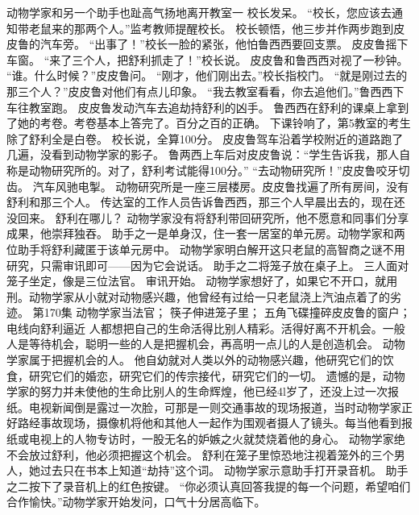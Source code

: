 \documentclass[a4paper,12pt,UTF8,twoside]{ctexbook}
\begin{document}
        动物学家和另一个助手也趾高气扬地离开教室一 
        校长发呆。 
        “校长，您应该去通知带老鼠来的那两个人。”监考教师提醒校长。 
        校长顿悟，他三步并作两步跑到皮皮鲁的汽车旁。 
        “出事了！”校长一脸的紧张，他怕鲁西西要回支票。 
        皮皮鲁摇下车窗。 
        “来了三个人，把舒利抓走了！”校长说。 
        皮皮鲁和鲁西西对视了一秒钟。 
        “谁。什么时候？”皮皮鲁问。 
        “刚才，他们刚出去。”校长指校门。 
        “就是刚过去的那三个人？”皮皮鲁对他们有点儿印象。 
        “我去教室看看，你去追他们。”鲁西西下车往教室跑。 
        皮皮鲁发动汽车去追劫持舒利的凶手。 
        鲁西西在舒利的课桌上拿到了她的考卷。考卷基本上答完了。百分之百的正确。 
        下课铃响了，第5教室的考生除了舒利全是白卷。 
        校长说，全算100分。 
        皮皮鲁驾车沿着学校附近的道路跑了几遍，没看到动物学家的影子。 
        鲁两西上车后对皮皮鲁说：“学生告诉我，那人自称是动物研究所的。对了，舒利考试能得100分。” 
        “去动物研究所！”皮皮鲁咬牙切齿。 
        汽车风驰电掣。 
        动物研究所是一座三层楼房。皮皮鲁找遍了所有房间，没有舒利和那三个人。 
        传达室的工作人员告诉鲁西西，那三个人早晨出去的，现在还没回来。 
        舒利在哪儿？ 
        动物学家没有将舒利带回研究所，他不愿意和同事们分享成果，他崇拜独吞。 
        助手之一是单身汉，住一套一居室的单元房。动物学家和两位助手将舒利藏匿于该单元房中。 
        动物学家明白解开这只老鼠的高智商之谜不用研究，只需审讯即可——因为它会说话。 
        助手之二将笼子放在桌子上。 
        三人面对笼子坐定，像是三位法官。 
        审讯开始。 
        动物学家想好了，如果它不开口，就用刑。动物学家从小就对动物感兴趣，他曾经有过给一只老鼠浇上汽油点着了的劣迹。   第170集 
        动物学家当法官； 
        筷子伸进笼子里； 
        五角飞碟撞碎皮皮鲁的窗户； 
        电线向舒利逼近   
        人都想把自己的生命活得比别人精彩。活得好离不开机会。一般人是等待机会，聪明一些的人是把握机会，再高明一点儿的人是创造机会。 
        动物学家属于把握机会的人。 
        他自幼就对人类以外的动物感兴趣，他研究它们的饮食，研究它们的婚恋，研究它们的传宗接代，研究它们的一切。 
        遗憾的是，动物学家的努力并未使他的生命比别人的生命辉煌，他已经4l岁了，还没上过一次报纸。电视新闻倒是露过一次脸，可那是一则交通事故的现场报道，当时动物学家正好路经事故现场，摄像机将他和其他人一起作为围观者摄人了镜头。每当他看到报纸或电视上的人物专访时，一股无名的妒嫉之火就焚烧着他的身心。 
        动物学家绝不会放过舒利，他必须把握这个机会。 
        舒利在笼子里惊恐地注视着笼外的三个男人，她过去只在书本上知道“劫持”这个词。 
        动物学家示意助手打开录音机。 
        助手之二按下了录音机上的红色按键。 
        “你必须认真回答我提的每一个问题，希望咱们合作愉快。”动物学家开始发问，口气十分居高临下。 
\end{document}

